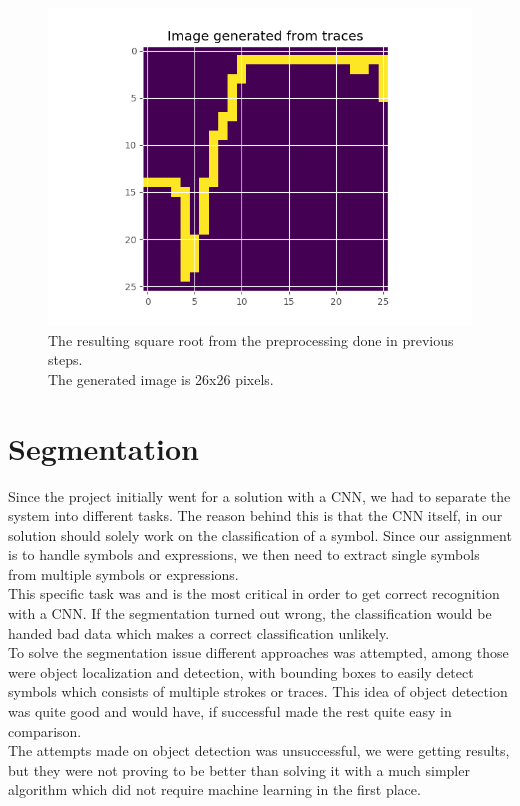 \begin{figure}[H]
    \centering
    \includegraphics{Assets/Chapter3_Method/sqrt_image.png}
    \caption{The resulting square root from the preprocessing done in previous steps.\\The generated image is 26x26 pixels.}
    \label{fig:sqrt_img}
\end{figure}

\section{Segmentation}
Since the project initially went for a solution with a CNN, we had to separate the system into different tasks. The reason behind this is that the CNN itself, in our solution should solely work on the classification of a symbol. Since our assignment is to handle symbols and expressions, we then need to extract single symbols from multiple symbols or expressions.\\
This specific task was and is the most critical in order to get correct recognition with a CNN. If the segmentation turned out wrong, the classification would be handed bad data which makes a correct classification unlikely.\\ To solve the segmentation issue different approaches was attempted, among those were object localization and detection, with bounding boxes to easily detect symbols which consists of multiple strokes or traces. This idea of object detection was quite good and would have, if successful made the rest quite easy in comparison.\\ The attempts made on object detection was unsuccessful, we were getting results, but they were not proving to be better than solving it with a much simpler algorithm which did not require machine learning in the first place. 


